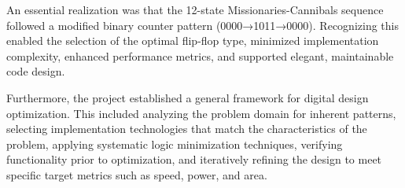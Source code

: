 \documentclass[10pt,a4paper]{article}
\begin{document}
An essential realization was that the 12-state Missionaries-Cannibals sequence followed a modified binary counter pattern (0000→1011→0000). Recognizing this enabled the selection of the optimal flip-flop type, minimized implementation complexity, enhanced performance metrics, and supported elegant, maintainable code design.

Furthermore, the project established a general framework for digital design optimization. This included analyzing the problem domain for inherent patterns, selecting implementation technologies that match the characteristics of the problem, applying systematic logic minimization techniques, verifying functionality prior to optimization, and iteratively refining the design to meet specific target metrics such as speed, power, and area.


\end{document}
